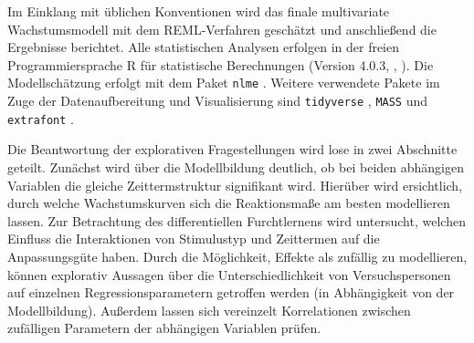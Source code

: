 
		Im Einklang mit üblichen Konventionen wird das finale multivariate Wachstumsmodell mit dem REML-Verfahren geschätzt und anschließend die Ergebnisse berichtet.
		Alle statistischen Analysen erfolgen in der freien Programmiersprache R für statistische Berechnungen (Version 4.0.3, \citeauthor{R}, \citeyear{R}). Die Modellschätzung erfolgt mit dem Paket \texttt{nlme} \parencite{nlme}. Weitere verwendete Pakete im Zuge der Datenaufbereitung und Visualisierung sind \texttt{tidyverse} \parencite{TIDYVERSE}, \texttt{MASS} \parencite{mass} und \texttt{extrafont} \parencite{EXTRAFONT}. %
		
		Die Beantwortung der explorativen Fragestellungen wird lose in zwei Abschnitte geteilt. Zunächst wird über die Modellbildung deutlich, ob bei beiden abhängigen Variablen die gleiche Zeittermstruktur signifikant wird. Hierüber wird ersichtlich, durch welche Wachstumskurven sich die Reaktionsmaße am besten modellieren lassen. 
		Zur Betrachtung des differentiellen Furchtlernens wird untersucht, welchen Einfluss die Interaktionen von Stimulustyp und Zeittermen auf die Anpassungsgüte haben. Durch die Möglichkeit, Effekte als zufällig zu modellieren, können explorativ Aussagen über die Unterschiedlichkeit von Versuchspersonen auf einzelnen Regressionsparametern getroffen werden (in Abhängigkeit von der Modellbildung). Außerdem lassen sich vereinzelt Korrelationen zwischen zufälligen Parametern der abhängigen Variablen prüfen.

